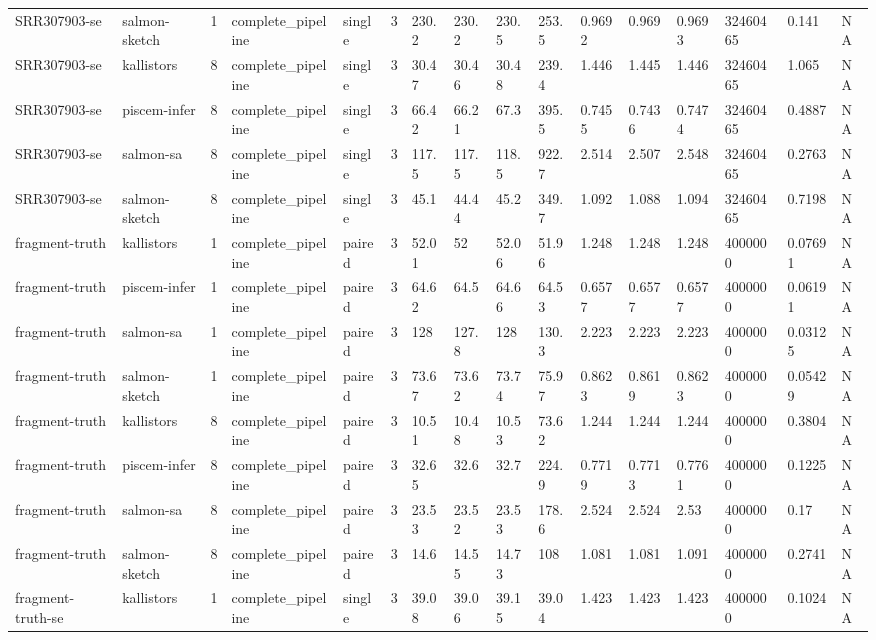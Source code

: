\begin{tabular}{llllllllllllllll}
SRR307903-se & salmon-sketch & 1 & complete\_pipeline & single & 3 & 230.2 & 230.2 & 230.5 & 253.5 & 0.9692 & 0.969 & 0.9693 & 32460465 & 0.141 & NA \\
SRR307903-se & kallistors & 8 & complete\_pipeline & single & 3 & 30.47 & 30.46 & 30.48 & 239.4 & 1.446 & 1.445 & 1.446 & 32460465 & 1.065 & NA \\
SRR307903-se & piscem-infer & 8 & complete\_pipeline & single & 3 & 66.42 & 66.21 & 67.3 & 395.5 & 0.7455 & 0.7436 & 0.7474 & 32460465 & 0.4887 & NA \\
SRR307903-se & salmon-sa & 8 & complete\_pipeline & single & 3 & 117.5 & 117.5 & 118.5 & 922.7 & 2.514 & 2.507 & 2.548 & 32460465 & 0.2763 & NA \\
SRR307903-se & salmon-sketch & 8 & complete\_pipeline & single & 3 & 45.1 & 44.44 & 45.2 & 349.7 & 1.092 & 1.088 & 1.094 & 32460465 & 0.7198 & NA \\
fragment-truth & kallistors & 1 & complete\_pipeline & paired & 3 & 52.01 & 52 & 52.06 & 51.96 & 1.248 & 1.248 & 1.248 & 4000000 & 0.07691 & NA \\
fragment-truth & piscem-infer & 1 & complete\_pipeline & paired & 3 & 64.62 & 64.5 & 64.66 & 64.53 & 0.6577 & 0.6577 & 0.6577 & 4000000 & 0.06191 & NA \\
fragment-truth & salmon-sa & 1 & complete\_pipeline & paired & 3 & 128 & 127.8 & 128 & 130.3 & 2.223 & 2.223 & 2.223 & 4000000 & 0.03125 & NA \\
fragment-truth & salmon-sketch & 1 & complete\_pipeline & paired & 3 & 73.67 & 73.62 & 73.74 & 75.97 & 0.8623 & 0.8619 & 0.8623 & 4000000 & 0.05429 & NA \\
fragment-truth & kallistors & 8 & complete\_pipeline & paired & 3 & 10.51 & 10.48 & 10.53 & 73.62 & 1.244 & 1.244 & 1.244 & 4000000 & 0.3804 & NA \\
fragment-truth & piscem-infer & 8 & complete\_pipeline & paired & 3 & 32.65 & 32.6 & 32.7 & 224.9 & 0.7719 & 0.7713 & 0.7761 & 4000000 & 0.1225 & NA \\
fragment-truth & salmon-sa & 8 & complete\_pipeline & paired & 3 & 23.53 & 23.52 & 23.53 & 178.6 & 2.524 & 2.524 & 2.53 & 4000000 & 0.17 & NA \\
fragment-truth & salmon-sketch & 8 & complete\_pipeline & paired & 3 & 14.6 & 14.55 & 14.73 & 108 & 1.081 & 1.081 & 1.091 & 4000000 & 0.2741 & NA \\
fragment-truth-se & kallistors & 1 & complete\_pipeline & single & 3 & 39.08 & 39.06 & 39.15 & 39.04 & 1.423 & 1.423 & 1.423 & 4000000 & 0.1024 & NA \\

\end{tabular}
